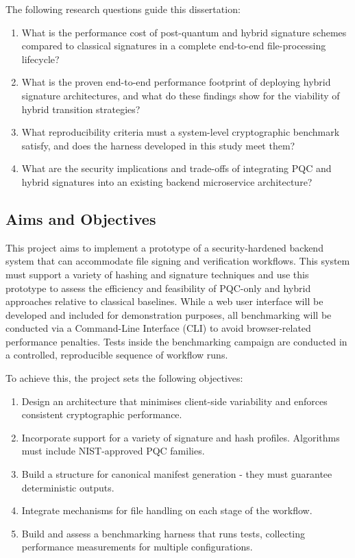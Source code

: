 \documentclass[12pt,a4paper]{article}
\begin{document}
The following research questions guide this dissertation:

\begin{enumerate}
    \item[RQ1.] What is the performance cost of post-quantum and hybrid signature schemes compared to classical signatures in a complete end-to-end file-processing lifecycle?
    \item[RQ2.] What is the proven end-to-end performance footprint of deploying hybrid signature architectures, and what do these findings show for the viability of hybrid transition strategies?
    \item[RQ3.] What reproducibility criteria must a system-level cryptographic benchmark satisfy, and does the harness developed in this study meet them?
    \item[RQ4.] What are the security implications and trade-offs of integrating PQC and hybrid signatures into an existing backend microservice architecture?
\end{enumerate}

\subsection{Aims and Objectives}

This project aims to implement a prototype of a security-hardened backend system that can accommodate file signing and verification workflows. This system must support a variety of hashing and signature techniques and use this prototype to assess the efficiency and feasibility of PQC-only and hybrid approaches relative to classical baselines. While a web user interface will be developed and included for demonstration purposes, all benchmarking will be conducted via a Command-Line Interface (CLI) to avoid browser-related performance penalties. Tests inside the benchmarking campaign are conducted in a controlled, reproducible sequence of workflow runs.

To achieve this, the project sets the following objectives:

\begin{enumerate}
    \item Design an architecture that minimises client-side variability and enforces consistent cryptographic performance.
    \item Incorporate support for a variety of signature and hash profiles. Algorithms must include NIST-approved PQC families.
    \item Build a structure for canonical manifest generation - they must guarantee deterministic outputs.
    \item Integrate mechanisms for file handling on each stage of the workflow.
    \item Build and assess a benchmarking harness that runs tests, collecting performance measurements for multiple configurations.
\end{enumerate}
\end{document}
